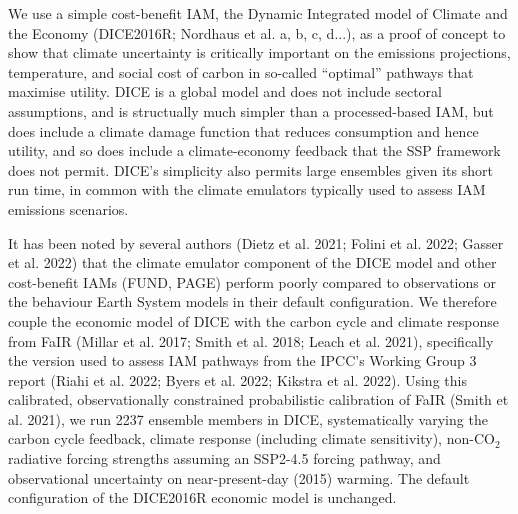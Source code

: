 \documentclass{article}
\begin{document}
We use a simple cost-benefit IAM, the Dynamic Integrated model of Climate and the Economy (DICE2016R; Nordhaus et al. a, b, c, d...), as a proof of concept to show that climate uncertainty is critically important on the emissions projections, temperature, and social cost of carbon in so-called ``optimal'' pathways that maximise utility. DICE is a global model and does not include sectoral assumptions, and is structually much simpler than a processed-based IAM, but does include a climate damage function that reduces consumption and hence utility, and so does include a climate-economy feedback that the SSP framework does not permit. DICE's simplicity also permits large ensembles given its short run time, in common with the climate emulators typically used to assess IAM emissions scenarios.

It has been noted by several authors (Dietz et al. 2021; Folini et al. 2022; Gasser et al. 2022) that the climate emulator component of the DICE model and other cost-benefit IAMs (FUND, PAGE) perform poorly compared to observations or the behaviour Earth System models in their default configuration. We therefore couple the economic model of DICE with the carbon cycle and climate response from FaIR (Millar et al. 2017; Smith et al. 2018; Leach et al. 2021), specifically the version used to assess IAM pathways from the IPCC's Working Group 3 report (Riahi et al. 2022; Byers et al. 2022; Kikstra et al. 2022). Using this calibrated, observationally constrained probabilistic calibration of FaIR (Smith et al. 2021), we run 2237 ensemble members in DICE, systematically varying the carbon cycle feedback, climate response (including climate sensitivity), non-CO$_2$ radiative forcing strengths assuming an SSP2-4.5 forcing pathway, and observational uncertainty on near-present-day (2015) warming. The default configuration of the DICE2016R economic model is unchanged.

\end{document}
